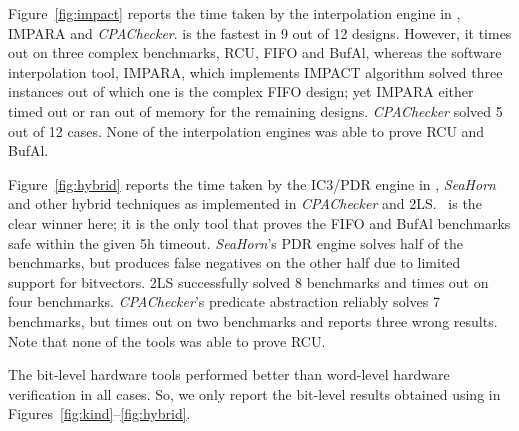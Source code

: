  Figure~\ref{fig:impact} reports
the time taken by the interpolation engine in \ABC, \textsc{IMPARA}
and \emph{CPAChecker}. \ABC is the fastest in 9 out of 12
designs. However, it times out on three complex benchmarks, RCU, FIFO
and BufAl, whereas the software interpolation tool, \textsc{IMPARA},
which implements IMPACT algorithm solved three instances out of which
one is the complex FIFO design; yet \textsc{IMPARA} either timed out or
ran out of memory for the remaining designs.  \emph{CPAChecker} solved
5 out of 12 cases.  None of the interpolation engines was able to
prove RCU and BufAl.

 Figure~\ref{fig:hybrid}
reports the time taken by the IC3/PDR engine in \ABC, \emph{SeaHorn}
and other hybrid techniques as implemented in \emph{CPAChecker} and
\textsc{2LS}. \ABC~is the clear winner here; it is the only tool that
proves the FIFO and BufAl benchmarks safe within the given 5h timeout.
\emph{SeaHorn}'s PDR engine solves half of the benchmarks, but
produces false negatives on the other half due to limited support for
bitvectors. \textsc{2LS} successfully solved 8 benchmarks and times 
out on four benchmarks.  \emph{CPAChecker}'s predicate abstraction reliably
solves 7 benchmarks, but times out on two benchmarks and reports three
wrong results. Note that none of the tools was able to prove RCU.

The bit-level hardware tools performed better than word-level hardware 
verification in all cases.  So, we only report the bit-level results 
obtained using \ABC in Figures~\ref{fig:kind}--\ref{fig:hybrid}.



